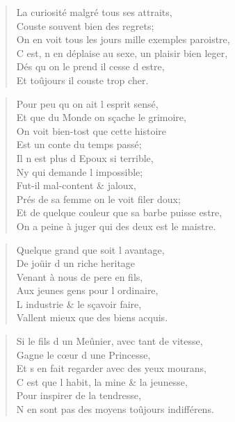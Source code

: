 \begin{verse}
La curiosité malgré tous ses attraits, \\
\vin\vin Couste souvent bien des regrets; \\
On en voit tous les jours mille exemples paroistre, \\
C\textquotesingle{} est, n\textquotesingle{} en déplaise au sexe, un plaisir bien leger, \\
\vin Dés qu\textquotesingle{} on le prend il cesse d\textquotesingle{} estre, \\
\vin Et toûjours il couste trop cher.
\end{verse}

\begin{verse}
\vin Pour peu qu\textquotesingle{} on ait l\textquotesingle{} esprit sensé, \\
\vin Et que du Monde on sçache le grimoire, \\
\vin\vin On voit bien-tost que cette histoire \\
\vin\vin Est un conte du temps passé; \\
\vin Il n\textquotesingle{} est plus d\textquotesingle{} Epoux si terrible, \\
\vin Ny qui demande l\textquotesingle{} impossible; \\
\vin Fut-il mal-content \& jaloux, \\
\vin Prés de sa femme on le voit filer doux; \\
Et de quelque couleur que sa barbe puisse estre, \\
On a peine à juger qui des deux est le maistre.
\end{verse}

\begin{verse}
\vin Quelque grand que soit l\textquotesingle{} avantage, \\
\vin De joüir d un riche heritage \\
Venant à nous de pere en fils, \\
Aux jeunes gens pour l\textquotesingle{} ordinaire, \\
L\textquotesingle{} industrie \& le sçavoir faire, \\
Vallent mieux que des biens acquis.
\end{verse}

\begin{verse}
Si le fils d\textquotesingle{} un Meûnier, avec tant de vitesse, \\
\vin Gagne le cœur d\textquotesingle{} une Princesse, \\
Et s\textquotesingle{} en fait regarder avec des yeux mourans, \\
\vin C\textquotesingle{} est que l\textquotesingle{} habit, la mine \& la jeunesse, \\
\vin Pour inspirer de la tendresse, \\
N\textquotesingle{} en sont pas des moyens toûjours indifférens.
\end{verse}

